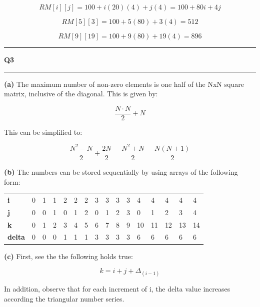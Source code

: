 \documentclass[11pt]{article}
\newcommand\question[2]{\vspace{.25in}\hrule\textbf{#1 #2}\vspace{.5em}\hrule\vspace{.10in}}
\renewcommand\part[1]{\vspace{.10in}\textbf{(#1)}}
\begin{document}
\[RM[i][j] = 100 + i(20)(4) + j(4) = 100 + 80i + 4j\] 

\[RM[5][3] = 100 + 5(80) + 3(4) = 512\] 

\[RM[9][19] = 100 + 9(80) + 19(4) = 896\] 


\question{Q3}{}
\part{a}
The maximum number of non-zero elements is one half of the NxN square matrix, inclusive of the diagonal. This is given by:

\[\frac{N \cdot N}{2} + N\]

This can be simplified to:

\[\frac{N^2 - N}{2} + \frac{2N}{2} = \frac{N^2 + N}{2} = \frac{N(N+1)}{2} \]

\part{b}
The numbers can be stored sequentially by using arrays of the following form:
\begin{table}[!htbp]
	\centering
	\begin{tabular}{
			>{\columncolor[HTML]{FFFE65}}l lllllllllllllll}
		\textbf{i}                     & 0 & 1 & 1 & 2 & 2 & 2 & 3 & 3 & 3 & 3 & 4  & 4  & 4  & 4  & 4  \\
		\textbf{j}                     & 0 & 0 & 1 & 0 & 1 & 2 & 0 & 1 & 2 & 3 & 0  & 1  & 2  & 3  & 4  \\
		\textbf{k}                     & 0 & 1 & 2 & 3 & 4 & 5 & 6 & 7 & 8 & 9 & 10 & 11 & 12 & 13 & 14 \\
		\textbf{delta} & 0 & 0 & 0 & 1 & 1 & 1 & 3 & 3 & 3 & 3 & 6  & 6  & 6  & 6  & 6 
	\end{tabular}
\end{table}

\part{c}
First, see the the following holds true:

\[k=i+j+\Delta_(i-1)\]

In addition, observe that for each increment of i, the delta value increases according the triangular number series.
\end{document}
